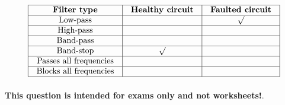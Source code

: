 
$$\vbox{\offinterlineskip
\halign{\strut
\vrule \quad\hfil # \ \hfil & 
\vrule \quad\hfil # \ \hfil & 
\vrule \quad\hfil # \ \hfil \vrule \cr
\noalign{\hrule}
%
{\bf Filter type} & {\bf Healthy circuit} & {\bf Faulted circuit} \cr
%
\noalign{\hrule}
%
Low-pass &  & $\surd$ \cr
%
\noalign{\hrule}
%
High-pass &  &  \cr
%
\noalign{\hrule}
%
Band-pass &  &  \cr
%
\noalign{\hrule}
%
Band-stop & $\surd$ &  \cr
%
\noalign{\hrule}
%
Passes all frequencies &  &  \cr
%
\noalign{\hrule}
%
Blocks all frequencies &  &  \cr
%
\noalign{\hrule}
} %
}$$ %








{\bf This question is intended for exams only and not worksheets!}.



